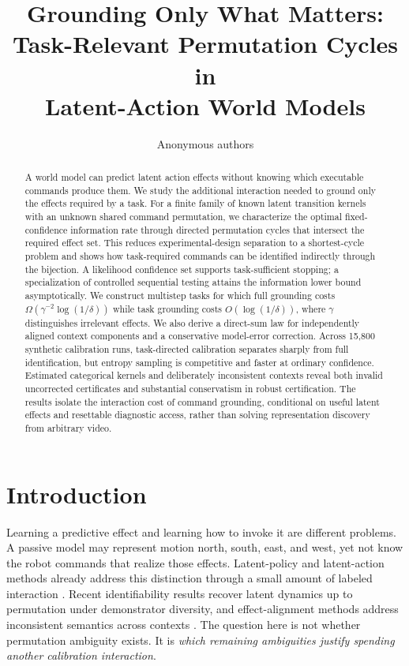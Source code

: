 \documentclass{article}
\title{Grounding Only What Matters:\\Task-Relevant Permutation Cycles in\\Latent-Action World Models}
\author{Anonymous authors}
\date{}
\begin{document}
\maketitle
{}
\begin{abstract}
A world model can predict latent action effects without knowing which executable commands produce them. We study the additional interaction needed to ground only the effects required by a task. For a finite family of known latent transition kernels with an unknown shared command permutation, we characterize the optimal fixed-confidence information rate through directed permutation cycles that intersect the required effect set. This reduces experimental-design separation to a shortest-cycle problem and shows how task-required commands can be identified indirectly through the bijection. A likelihood confidence set supports task-sufficient stopping; a specialization of controlled sequential testing attains the information lower bound asymptotically. We construct multistep tasks for which full grounding costs $\Omega(\gamma^{-2}\log(1/\delta))$ while task grounding costs $O(\log(1/\delta))$, where $\gamma$ distinguishes irrelevant effects. We also derive a direct-sum law for independently aligned context components and a conservative model-error correction. Across 15,800 synthetic calibration runs, task-directed calibration separates sharply from full identification, but entropy sampling is competitive and faster at ordinary confidence. Estimated categorical kernels and deliberately inconsistent contexts reveal both invalid uncorrected certificates and substantial conservatism in robust certification. The results isolate the interaction cost of command grounding, conditional on useful latent effects and resettable diagnostic access, rather than solving representation discovery from arbitrary video.
\end{abstract}

\section{Introduction}
Learning a predictive effect and learning how to invoke it are different problems. A passive model may represent motion north, south, east, and west, yet not know the robot commands that realize those effects. Latent-policy and latent-action methods already address this distinction through a small amount of labeled interaction \citep{edwards2019,schmidt2023}. Recent identifiability results recover latent dynamics up to permutation under demonstrator diversity, and effect-alignment methods address inconsistent semantics across contexts \citep{schur2026,jiang2026}. The question here is not whether permutation ambiguity exists. It is \emph{which remaining ambiguities justify spending another calibration interaction}.
\end{document}
